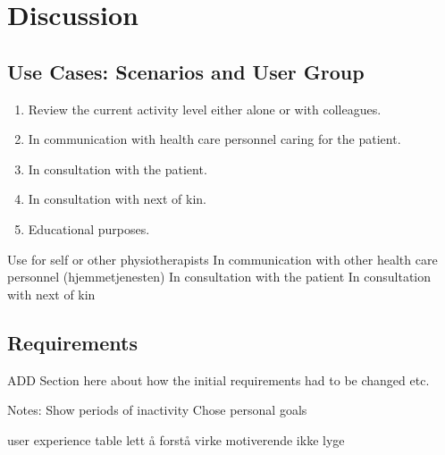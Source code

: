 \chapter{Discussion}

\section{Use Cases: Scenarios and User Group}
\begin{enumerate}
  \item Review the current activity level either alone or with colleagues.
  \item In communication with health care personnel caring for the patient.
  \item In consultation with the patient.
  \item In consultation with next of kin.
  \item Educational purposes.
\end{enumerate}

Use for self or other physiotherapists
In communication with other health care personnel (hjemmetjenesten)
In consultation with the patient
In consultation with next of kin 

\section{Requirements}
ADD Section here about how the initial requirements had to be changed etc.

Notes:
  Show periods of inactivity
  Chose personal goals

  user experience table
  lett å forstå
  virke motiverende
  ikke lyge 

